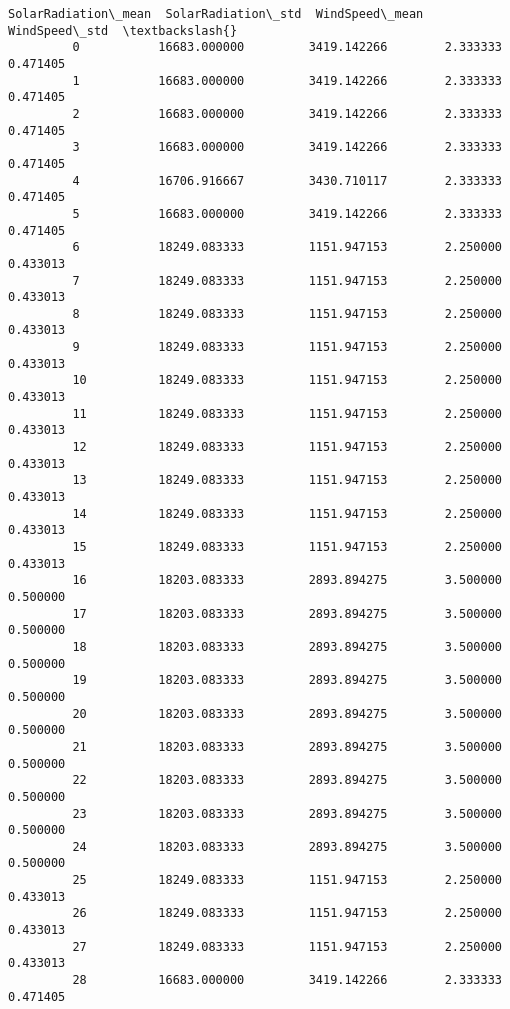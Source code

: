 \documentclass[11pt]{article}
\begin{document}
\begin{Verbatim}[commandchars=\\\{\}]
              SolarRadiation\_mean  SolarRadiation\_std  WindSpeed\_mean  WindSpeed\_std  \textbackslash{}
         0           16683.000000         3419.142266        2.333333       0.471405   
         1           16683.000000         3419.142266        2.333333       0.471405   
         2           16683.000000         3419.142266        2.333333       0.471405   
         3           16683.000000         3419.142266        2.333333       0.471405   
         4           16706.916667         3430.710117        2.333333       0.471405   
         5           16683.000000         3419.142266        2.333333       0.471405   
         6           18249.083333         1151.947153        2.250000       0.433013   
         7           18249.083333         1151.947153        2.250000       0.433013   
         8           18249.083333         1151.947153        2.250000       0.433013   
         9           18249.083333         1151.947153        2.250000       0.433013   
         10          18249.083333         1151.947153        2.250000       0.433013   
         11          18249.083333         1151.947153        2.250000       0.433013   
         12          18249.083333         1151.947153        2.250000       0.433013   
         13          18249.083333         1151.947153        2.250000       0.433013   
         14          18249.083333         1151.947153        2.250000       0.433013   
         15          18249.083333         1151.947153        2.250000       0.433013   
         16          18203.083333         2893.894275        3.500000       0.500000   
         17          18203.083333         2893.894275        3.500000       0.500000   
         18          18203.083333         2893.894275        3.500000       0.500000   
         19          18203.083333         2893.894275        3.500000       0.500000   
         20          18203.083333         2893.894275        3.500000       0.500000   
         21          18203.083333         2893.894275        3.500000       0.500000   
         22          18203.083333         2893.894275        3.500000       0.500000   
         23          18203.083333         2893.894275        3.500000       0.500000   
         24          18203.083333         2893.894275        3.500000       0.500000   
         25          18249.083333         1151.947153        2.250000       0.433013   
         26          18249.083333         1151.947153        2.250000       0.433013   
         27          18249.083333         1151.947153        2.250000       0.433013   
         28          16683.000000         3419.142266        2.333333       0.471405   

\end{Verbatim}
\end{document}
